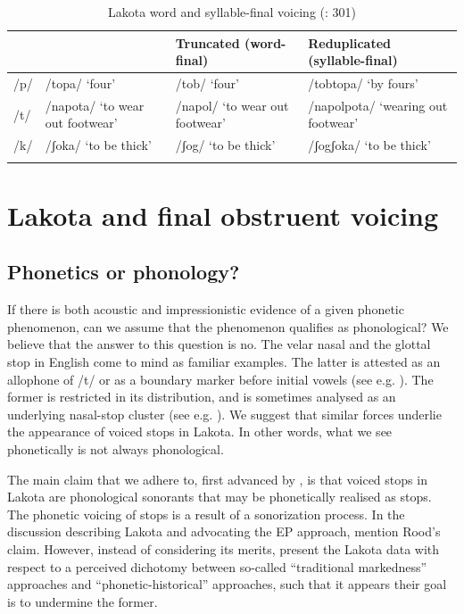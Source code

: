 \documentclass[output=paper]{langscibook}
\begin{document}
\begin{table}
\caption{\label{extab:schwartz:1} Lakota word and syllable-final voicing (\citealt{BlevinsEtAl2020}: 301)}
\begin{tabularx}{\textwidth}{lQQQ}
\lsptoprule
&  & {Truncated (word-final)}  & {Reduplicated (syllable-final)}\\
\midrule
{/p/} & {/topa/ ‘four’} & {/tob/ ‘four’} & {/tobtopa/ ‘by fours’}\\
{/t/} & {/napota/ ‘to wear out footwear’} & {/napol/ ‘to wear out footwear’} & {/napolpota/ ‘wearing out footwear’}\\
{/k/} & {/ʃoka/ ‘to be thick’} & {/ʃog/ ‘to be thick’} & {/ʃogʃoka/ ‘to be thick’}\\
\lspbottomrule
\end{tabularx}
\end{table}

\section{Lakota and final obstruent voicing}
\label{sec:schwartz:2}
\subsection{Phonetics or phonology?} 
\label{sec:schwartz:2.1}
If there is both acoustic and impressionistic evidence of a given phonetic phenomenon, can we assume that the phenomenon qualifies as phonological? We believe that the answer to this question is no. The velar nasal and the glottal stop in English come to mind as familiar examples. The latter is attested as an allophone of /t/ or as a boundary marker before initial vowels (see e.g. \citealt{Cruttenden2001}). The former is restricted in its distribution, and is sometimes analysed as an underlying nasal-stop cluster (see e.g. \citealt{Smith1982}). We suggest that similar forces underlie the appearance of voiced stops in Lakota. In other words, what we see phonetically is not always phonological. 

   The main claim that we adhere to, first advanced by \citet{Rood2016}, is that voiced stops in Lakota are phonological sonorants that may be phonetically realised as stops. The phonetic voicing of stops is a result of a sonorization process. In the discussion describing Lakota and advocating the EP approach, \citet{BlevinsEtAl2020}  mention Rood’s claim. However, instead of considering its merits, \citet[296]{BlevinsEtAl2020} present the Lakota data with respect to a perceived dichotomy between so-called “traditional markedness” approaches and “phonetic-historical” approaches, such that it appears their goal is to undermine the former.
\end{document}
